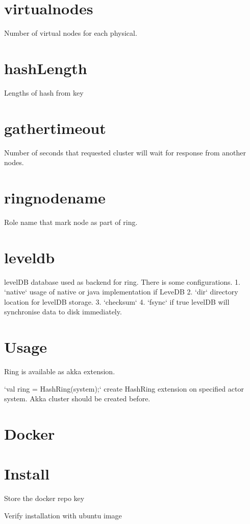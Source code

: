 \section*{virtual\-nodes} 

Number of virtual nodes for each physical.

\section*{hashLength}

Lengths of hash from key

\section*{gather\-timeout}
Number of seconds that requested cluster will wait for response from another nodes. 

\section*{ring\-node\-name}
Role name that mark node as part of ring.

\section*{leveldb}
levelDB database used as backend for ring. There is some configurations.
1. `native` \- usage of native or java implementation if LeveDB
2. `dir` \- directory location for levelDB storage.
3. `checksum`
4. `fsync` \- if true levelDB will synchronise data to disk immediately.

\section*{Usage}

Ring is available as akka extension.

`val ring = HashRing(system);` \- create HashRing extension on specified actor system. Akka cluster should be created before.

\section*{Docker}
\section*{Install}
Store the docker repo key


Verify installation with ubuntu image

